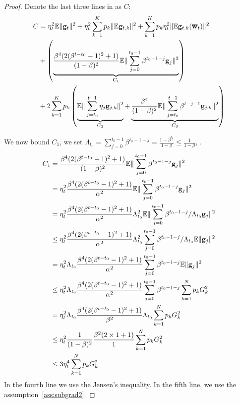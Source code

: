 \begin{proof}
Denote the last three lines in \eq{\ref{eq:nagcvx7}} as $C$: 
\begin{align}
C &= \eta_t^2\mathbb{E}\|{\mathbf{g}}_t\|^2 +\eta^2_t \sum_{k=1}^K p_k\|\mathbb{E} {\mathbf{g}}_{t,k}\|^2+ \sum_{k=1}^K p_k \eta_t^2 \|\mathbb{E} {\mathbf{g}}_{t,k}(\overline{{\mathbf{w}}}_t)\|^2  \nonumber \\
	& +  \left(\underbrace{\frac{\beta^4(2(\beta^{t-t_0}-1)^2 + 1)}{(1-\beta)^2} \mathbb{E}\|\sum_{j=0}^{t_0 - 1}\beta^{t_0-1-j}{\mathbf{g}}_j\|^2}_{C_1} \right) \nonumber\\
	& + 2\sum_{k=1}^K p_k \left(\underbrace{\mathbb{E} \|\sum_{j=t_0}^{t-1}\eta_j {\mathbf{g}}_{j,k}\|^2 }_{C_2} + \underbrace{\frac{\beta^4}{(1 - \beta)^2} \mathbb{E}\|\sum_{j=t_0}^{t-1}\beta^{t-j-1}{\mathbf{g}}_{j,k}\|^2}_{C_3} \right)  \label{eq:nagcvxc}
\end{align}



We now bound $C_1$, we set $\Lambda_{t_0} = \sum_{j=0}^{t_0 - 1}\beta^{t_0-1-j} = \frac{1 - \beta^{t_0}}{1- \beta} \leq \frac{1}{1 - \beta}$, .
\begin{align}
	C_1 &=  \frac{\beta^4(2(\beta^{t-t_0}-1)^2 + 1)}{(1-\beta)^2} \mathbb{E}\|\sum_{j=0}^{t_0 - 1}\beta^{t_0-1-j}{\mathbf{g}}_j\|^2\\
        &= \eta_t^2 \frac{\beta^4(2(\beta^{t-t_0}-1)^2 + 1)}{\alpha^2} \mathbb{E}\|\sum_{j=0}^{t_0 - 1}\beta^{t_0-1-j}{\mathbf{g}}_j\|^2\\
        &= \eta_t^2  \frac{\beta^4(2(\beta^{t-t_0}-1)^2 + 1)}{\alpha^2}\Lambda_{t_0}^2 \mathbb{E}\|\sum_{j=0}^{t_0 - 1}\beta^{t_0-1-j}/\Lambda_{t_0} {\mathbf{g}}_j\|^2\\
        & \leq \eta_t^2  \frac{\beta^4(2(\beta^{t-t_0}-1)^2 + 1)}{\alpha^2}\Lambda_{t_0}^2 \sum_{j=0}^{t_0 - 1}\beta^{t_0-1-j}/\Lambda_{t_0}\mathbb{E}\| {\mathbf{g}}_j\|^2\\ 
        & = \eta_t^2 \Lambda_{t_0} \frac{\beta^4(2(\beta^{t-t_0}-1)^2 + 1)}{\alpha^2} \sum_{j=0}^{t_0 - 1}\beta^{t_0-1-j} \mathbb{E}\| {\mathbf{g}}_j\|^2\\
		& \leq  \eta_t^2 \Lambda_{t_0} \frac{\beta^4(2(\beta^{t-t_0}-1)^2 + 1)}{\alpha^2} \sum_{j=0}^{t_0 - 1}\beta^{t_0-1-j} \sum_{k=1}^N p_k G_k^2   \\
		& =  \eta_t^2 \Lambda_{t_0} \frac{\beta^4(2(\beta^{t-t_0}-1)^2 + 1)}{\beta^2} \Lambda_{t_0}  \sum_{k=1}^N p_k G_k^2  \\
		& \leq  \eta_t^2 \frac{1}{(1-\beta)^2} \frac{\beta^2(2 \times 1 + 1)}{1} \sum_{k=1}^N p_k G_k^2   \\
		& \leq  3 \eta_t^4\sum_{k=1}^N p_k G_k^2   \label{eq:nagcvxc1}
\end{align}
In the fourth line we use the Jensen's inequality. In the fifth line, we use the assumption~\ref{ass:subgrad2}. 



\end{proof}
